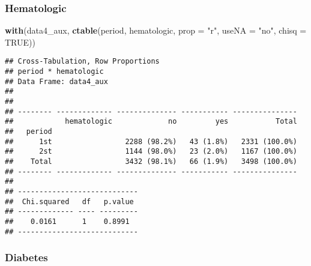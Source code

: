 \documentclass[
]{article}
\newenvironment{Shaded}{\begin{snugshade}}{\end{snugshade}}
\newcommand{\DataTypeTok}[1]{\textcolor[rgb]{0.13,0.29,0.53}{#1}}
\newcommand{\KeywordTok}[1]{\textcolor[rgb]{0.13,0.29,0.53}{\textbf{#1}}}
\newcommand{\NormalTok}[1]{#1}
\newcommand{\OperatorTok}[1]{\textcolor[rgb]{0.81,0.36,0.00}{\textbf{#1}}}
\newcommand{\OtherTok}[1]{\textcolor[rgb]{0.56,0.35,0.01}{#1}}
\newcommand{\StringTok}[1]{\textcolor[rgb]{0.31,0.60,0.02}{#1}}
\begin{document}
\hypertarget{hematologic-2}{%
\subsubsection{Hematologic}\label{hematologic-2}}

\begin{Shaded}
\begin{Highlighting}[]
\KeywordTok{with}\NormalTok{(data4_aux, }\KeywordTok{ctable}\NormalTok{(period, hematologic, }\DataTypeTok{prop =} \StringTok{"r"}\NormalTok{, }\DataTypeTok{useNA =} \StringTok{"no"}\NormalTok{, }\DataTypeTok{chisq =} \OtherTok{TRUE}\NormalTok{))}
\end{Highlighting}
\end{Shaded}

\begin{verbatim}
## Cross-Tabulation, Row Proportions  
## period * hematologic  
## Data Frame: data4_aux  
## 
## 
## -------- ------------- -------------- ----------- ---------------
##            hematologic             no         yes           Total
##   period                                                         
##      1st                 2288 (98.2%)   43 (1.8%)   2331 (100.0%)
##      2st                 1144 (98.0%)   23 (2.0%)   1167 (100.0%)
##    Total                 3432 (98.1%)   66 (1.9%)   3498 (100.0%)
## -------- ------------- -------------- ----------- ---------------
## 
## ----------------------------
##  Chi.squared   df   p.value 
## ------------- ---- ---------
##    0.0161      1    0.8991  
## ----------------------------
\end{verbatim}

\hypertarget{diabetes-2}{%
\subsubsection{Diabetes}\label{diabetes-2}}

\begin{Shaded}
\end{Shaded}
\end{document}
